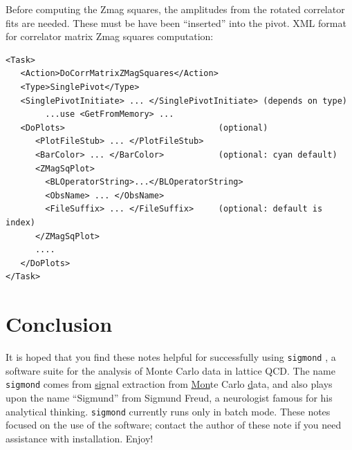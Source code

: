 \documentclass[12pt]{article}
\newcommand{\sigmond}{\texttt{sigmond} }
\begin{document}
Before computing the Zmag squares, the amplitudes from the rotated correlator fits are needed.
These must be have been ``inserted'' into the pivot. XML format for correlator matrix Zmag squares computation:

\begin{verbatim}
<Task>
   <Action>DoCorrMatrixZMagSquares</Action>
   <Type>SinglePivot</Type>
   <SinglePivotInitiate> ... </SinglePivotInitiate> (depends on type)
        ...use <GetFromMemory> ...
   <DoPlots>                               (optional)
      <PlotFileStub> ... </PlotFileStub>
      <BarColor> ... </BarColor>           (optional: cyan default)
      <ZMagSqPlot>
        <BLOperatorString>...</BLOperatorString>
        <ObsName> ... </ObsName>
        <FileSuffix> ... </FileSuffix>     (optional: default is index)
      </ZMagSqPlot>
      ....
   </DoPlots>
</Task>
\end{verbatim}

\section{Conclusion}

It is hoped that you find these notes helpful for successfully using
\sigmond, a software suite for the analysis of Monte Carlo data in
lattice QCD.  The name \texttt{sigmond} comes from \underline{sig}nal
extraction from \underline{Mon}te Carlo \underline{d}ata, and also plays
upon the name ``Sigmund'' from Sigmund Freud, a neurologist famous for
his analytical thinking.
\sigmond currently runs only in batch mode.
These notes focused on the use of the software; contact the author
of these note if you need assistance with installation.
Enjoy!
\end{document}
